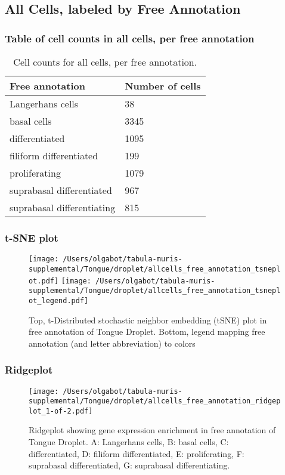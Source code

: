 \clearpage
\subsection{All Cells, labeled by Free Annotation}
\subsubsection{Table of cell counts in all cells, per free annotation}\begin{table}[h]
\centering
\label{my-label}
\begin{tabular}{@{}ll@{}}
\toprule

Free annotation& Number of cells \\ \midrule
Langerhans cells & 38 \\

basal cells & 3345 \\

differentiated & 1095 \\

filiform differentiated & 199 \\

proliferating & 1079 \\

suprabasal differentiated & 967 \\

suprabasal differentiating & 815 \\
\bottomrule
\end{tabular}
\caption{Cell counts for all cells, per free annotation.}
\end{table}

\clearpage
\subsubsection{t-SNE plot}
\begin{figure}[h]
\centering
\texttt{[image: /Users/olgabot/tabula-muris-supplemental/Tongue/droplet/allcells\_free\_annotation\_tsneplot.pdf]}
\texttt{[image: /Users/olgabot/tabula-muris-supplemental/Tongue/droplet/allcells\_free\_annotation\_tsneplot\_legend.pdf]}
\caption{Top, t-Distributed stochastic neighbor embedding (tSNE) plot  in free annotation of Tongue Droplet. Bottom, legend mapping free annotation (and letter abbreviation) to colors}
\end{figure}


\clearpage
\clearpage
\subsubsection{Ridgeplot}
\begin{figure}[h]
\centering
\texttt{[image: /Users/olgabot/tabula-muris-supplemental/Tongue/droplet/allcells\_free\_annotation\_ridgeplot\_1-of-2.pdf]}

\caption{ Ridgeplot  showing gene expression enrichment in free annotation of Tongue Droplet. A: Langerhans cells, B: basal cells, C: differentiated, D: filiform differentiated, E: proliferating, F: suprabasal differentiated, G: suprabasal differentiating.}
\end{figure}


